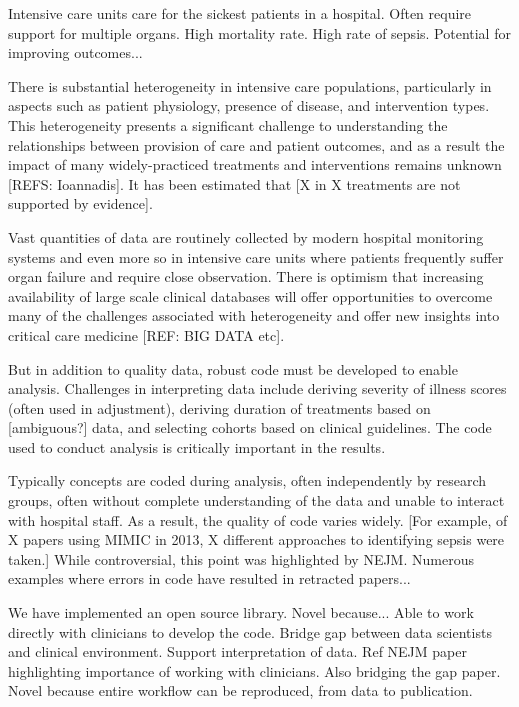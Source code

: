 \documentclass{elsart}
\begin{document}
Intensive care units care for the sickest patients in a hospital. Often require support for multiple organs. High mortality rate. High rate of sepsis. Potential for improving outcomes...

There is substantial heterogeneity in intensive care populations, particularly in aspects such as patient physiology, presence of disease, and intervention types. This heterogeneity presents a significant challenge to understanding the relationships between provision of care and patient outcomes, and as a result the impact of many widely-practiced treatments and interventions remains unknown [REFS: Ioannadis]. It has been estimated that [X in X treatments are not supported by evidence]. 

Vast quantities of data are routinely collected by modern hospital monitoring systems and even more so in intensive care units where patients frequently suffer organ failure and require close observation. There is optimism that increasing availability of large scale clinical databases will offer opportunities to overcome many of the challenges associated with heterogeneity and offer new insights into critical care medicine [REF: BIG DATA etc]. 

But in addition to quality data, robust code must be developed to enable analysis. Challenges in interpreting data include deriving severity of illness scores (often used in adjustment), deriving duration of treatments based on [ambiguous?] data, and selecting cohorts based on clinical guidelines. The code used to conduct analysis is critically important in the results.

Typically concepts are coded during analysis, often independently by research groups, often without complete understanding of the data and unable to interact with hospital staff. As a result, the quality of code varies widely. [For example, of X papers using MIMIC in 2013, X different approaches to identifying sepsis were taken.] While controversial, this point was highlighted by NEJM. Numerous examples where errors in code have resulted in retracted papers...

We have implemented an open source library. Novel because... Able to work directly with clinicians to develop the code. Bridge gap between data scientists and clinical environment. Support interpretation of data. Ref NEJM paper highlighting importance of working with clinicians. Also bridging the gap paper. Novel because entire workflow can be reproduced, from data to publication.

\end{document}
